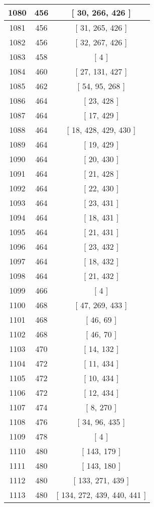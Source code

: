 \begin{center}
\begin{longtable}[H]{|| c c c ||}
\hline
1080 & 456 & [ 30, 266, 426 ] \\ 
\hline
1081 & 456 & [ 31, 265, 426 ] \\ 
\hline
1082 & 456 & [ 32, 267, 426 ] \\ 
\hline
1083 & 458 & [ 4 ] \\ 
\hline
1084 & 460 & [ 27, 131, 427 ] \\ 
\hline
1085 & 462 & [ 54, 95, 268 ] \\ 
\hline
1086 & 464 & [ 23, 428 ] \\ 
\hline
1087 & 464 & [ 17, 429 ] \\ 
\hline
1088 & 464 & [ 18, 428, 429, 430 ] \\ 
\hline
1089 & 464 & [ 19, 429 ] \\ 
\hline
1090 & 464 & [ 20, 430 ] \\ 
\hline
1091 & 464 & [ 21, 428 ] \\ 
\hline
1092 & 464 & [ 22, 430 ] \\ 
\hline
1093 & 464 & [ 23, 431 ] \\ 
\hline
1094 & 464 & [ 18, 431 ] \\ 
\hline
1095 & 464 & [ 21, 431 ] \\ 
\hline
1096 & 464 & [ 23, 432 ] \\ 
\hline
1097 & 464 & [ 18, 432 ] \\ 
\hline
1098 & 464 & [ 21, 432 ] \\ 
\hline
1099 & 466 & [ 4 ] \\ 
\hline
1100 & 468 & [ 47, 269, 433 ] \\ 
\hline
1101 & 468 & [ 46, 69 ] \\ 
\hline
1102 & 468 & [ 46, 70 ] \\ 
\hline
1103 & 470 & [ 14, 132 ] \\ 
\hline
1104 & 472 & [ 11, 434 ] \\ 
\hline
1105 & 472 & [ 10, 434 ] \\ 
\hline
1106 & 472 & [ 12, 434 ] \\ 
\hline
1107 & 474 & [ 8, 270 ] \\ 
\hline
1108 & 476 & [ 34, 96, 435 ] \\ 
\hline
1109 & 478 & [ 4 ] \\ 
\hline
1110 & 480 & [ 143, 179 ] \\ 
\hline
1111 & 480 & [ 143, 180 ] \\ 
\hline
1112 & 480 & [ 133, 271, 439 ] \\ 
\hline
1113 & 480 & [ 134, 272, 439, 440, 441 ] \\ 

\end{longtable}
\end{center}
